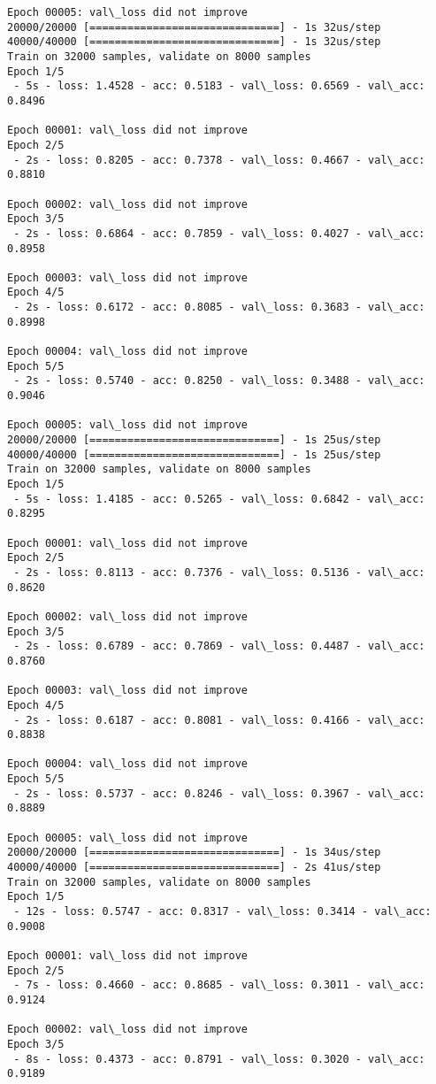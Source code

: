 \documentclass[11pt]{article}
\begin{document}
\begin{Verbatim}[commandchars=\\\{\}]
Epoch 00005: val\_loss did not improve
20000/20000 [==============================] - 1s 32us/step
40000/40000 [==============================] - 1s 32us/step
Train on 32000 samples, validate on 8000 samples
Epoch 1/5
 - 5s - loss: 1.4528 - acc: 0.5183 - val\_loss: 0.6569 - val\_acc: 0.8496

Epoch 00001: val\_loss did not improve
Epoch 2/5
 - 2s - loss: 0.8205 - acc: 0.7378 - val\_loss: 0.4667 - val\_acc: 0.8810

Epoch 00002: val\_loss did not improve
Epoch 3/5
 - 2s - loss: 0.6864 - acc: 0.7859 - val\_loss: 0.4027 - val\_acc: 0.8958

Epoch 00003: val\_loss did not improve
Epoch 4/5
 - 2s - loss: 0.6172 - acc: 0.8085 - val\_loss: 0.3683 - val\_acc: 0.8998

Epoch 00004: val\_loss did not improve
Epoch 5/5
 - 2s - loss: 0.5740 - acc: 0.8250 - val\_loss: 0.3488 - val\_acc: 0.9046

Epoch 00005: val\_loss did not improve
20000/20000 [==============================] - 1s 25us/step
40000/40000 [==============================] - 1s 25us/step
Train on 32000 samples, validate on 8000 samples
Epoch 1/5
 - 5s - loss: 1.4185 - acc: 0.5265 - val\_loss: 0.6842 - val\_acc: 0.8295

Epoch 00001: val\_loss did not improve
Epoch 2/5
 - 2s - loss: 0.8113 - acc: 0.7376 - val\_loss: 0.5136 - val\_acc: 0.8620

Epoch 00002: val\_loss did not improve
Epoch 3/5
 - 2s - loss: 0.6789 - acc: 0.7869 - val\_loss: 0.4487 - val\_acc: 0.8760

Epoch 00003: val\_loss did not improve
Epoch 4/5
 - 2s - loss: 0.6187 - acc: 0.8081 - val\_loss: 0.4166 - val\_acc: 0.8838

Epoch 00004: val\_loss did not improve
Epoch 5/5
 - 2s - loss: 0.5737 - acc: 0.8246 - val\_loss: 0.3967 - val\_acc: 0.8889

Epoch 00005: val\_loss did not improve
20000/20000 [==============================] - 1s 34us/step
40000/40000 [==============================] - 2s 41us/step
Train on 32000 samples, validate on 8000 samples
Epoch 1/5
 - 12s - loss: 0.5747 - acc: 0.8317 - val\_loss: 0.3414 - val\_acc: 0.9008

Epoch 00001: val\_loss did not improve
Epoch 2/5
 - 7s - loss: 0.4660 - acc: 0.8685 - val\_loss: 0.3011 - val\_acc: 0.9124

Epoch 00002: val\_loss did not improve
Epoch 3/5
 - 8s - loss: 0.4373 - acc: 0.8791 - val\_loss: 0.3020 - val\_acc: 0.9189


\end{Verbatim}
\end{document}
